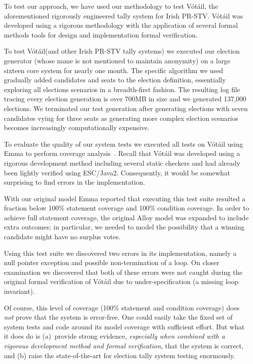 \documentclass[runningheads,a4paper]{llncs}
\newcommand{\votail}{V\'{o}t\'{a}il\xspace}
\begin{document}
To test our approach, we have used our methodology to test \votail,
the aforementioned rigorously engineered tally system for Irish
PR-STV.  \votail was developed using a rigorous methodology with the
application of several formal methods tools for design and
implementation formal verification.

To test \votail (and other Irish PR-STV tally systems) we executed our
election generator (whose name is not mentioned to maintain anonymity)
on a large sixteen core system for nearly one month.  The specific
algorithm we used gradually added candidates and seats to the election
definition, essentially exploring all elections scenarios in a
breadth-first fashion.  The resulting log file tracing every election
generation is over 700MB in size and we generated 137,000 elections.
We terminated our test generation after generating elections with
seven candidates vying for three seats as generating more complex
election scenarios becomes increasingly computationally expensive.

To evaluate the quality of our system tests we executed all tests on
\votail using Emma to perform coverage analysis~\cite{Emma}.  Recall
that \votail was developed using a rigorous development method
including several static checkers and had already been lightly
verified using ESC/Java2.  Consequently, it would be somewhat
surprising to find errors in the implementation.

With our original model Emma reported that executing this test suite
resulted a fraction below 100\% statement coverage and 100\% condition
coverage.  In order to achieve full statement coverage, the original
Alloy model was expanded to include extra outcomes; in particular, we
needed to model the possibility that a winning candidate might have no
surplus votes.

Using this test suite we discovered two errors in its implementation,
namely a null pointer exception and possible non-termination of a
loop.  On closer examination we discovered that both of these errors
were not caught during the original formal verification of \votail due
to under-specification (a missing loop invariant).

Of course, this level of coverage (100\% statement and condition
coverage) does \emph{not} prove that the system is error-free.  One
could easily take the fixed set of system tests and code around its
model coverage with sufficient effort.  But what it does do is
(a)~provide strong evidence, \emph{especially when combined with a rigorous
development method and formal verification}, that the system is
correct, and (b) raise the state-of-the-art for election tally system
testing enormously.
\end{document}
